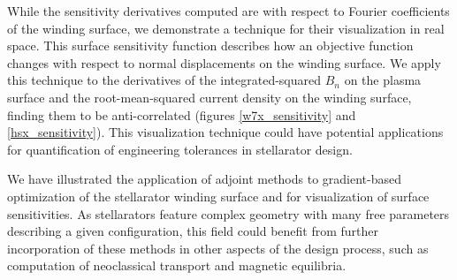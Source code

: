 \documentclass[aps,unsortedaddress]{revtex4-1}
\begin{document}
While the sensitivity derivatives computed are with respect to Fourier coefficients of the winding surface, we demonstrate a technique for their visualization in real space. This surface sensitivity function describes how an objective function changes with respect to normal displacements on the winding surface. We apply this technique to the derivatives of the integrated-squared $B_n$ on the plasma surface and the root-mean-squared current density on the winding surface, finding them to be anti-correlated (figures \ref{w7x_sensitivity} and \ref{hsx_sensitivity}). This visualization technique could have potential applications for quantification of engineering tolerances in stellarator design. 

We have illustrated the application of adjoint methods to gradient-based optimization of the stellarator winding surface and for visualization of surface sensitivities. As stellarators feature complex geometry with many free parameters describing a given configuration, this field could benefit from further incorporation of these methods in other aspects of the design process, such as computation of neoclassical transport and magnetic equilibria. 

\appendix
\end{document}
